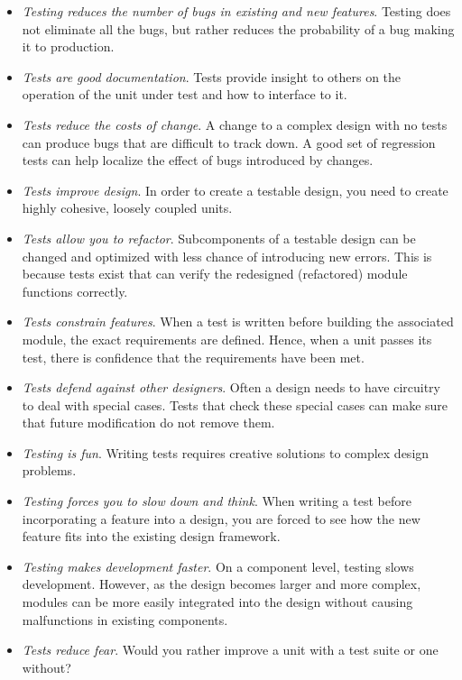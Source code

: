 {\begin{itemize}
\item
  \emph{Testing reduces the number of bugs in existing and new
  features}. Testing does not eliminate all the bugs, but rather reduces
  the probability of a bug making it to production.
\item
  \emph{Tests are good documentation}. Tests provide insight to others
  on the operation of the unit under test and how to interface to it.
\item
  \emph{Tests reduce the costs of change}. A change to a complex design
  with no tests can produce bugs that are difficult to track down. A
  good set of regression tests can help localize the effect of bugs
  introduced by changes.
\item
  \emph{Tests improve design}. In order to create a testable design, you
  need to create highly cohesive, loosely coupled units.
\item
  \emph{Tests allow you to refactor}. Subcomponents of a testable design
  can be changed and optimized with less chance of introducing new
  errors. This is because tests exist that can verify the redesigned
  (refactored) module functions correctly.
\item
  \emph{Tests constrain features}. When a test is written before
  building the associated module, the exact requirements are defined.
  Hence, when a unit passes its test, there is confidence that the
  requirements have been met.
\item
  \emph{Tests defend against other designers}. Often a design needs to
  have circuitry to deal with special cases. Tests that check these
  special cases can make sure that future modification do not remove
  them.
\item
  \emph{Testing is fun}. Writing tests requires creative solutions to
  complex design problems.
\item
  \emph{Testing forces you to slow down and think}. When writing a test
  before incorporating a feature into a design, you are forced to see
  how the new feature fits into the existing design framework.
\item
  \emph{Testing makes development faster}. On a component level, testing
  slows development. However, as the design becomes larger and more
  complex, modules can be more easily integrated into the design without
  causing malfunctions in existing components.
\item
  \emph{Tests reduce fear}. Would you rather improve a unit with a test
  suite or one without?
\end{itemize}

}
